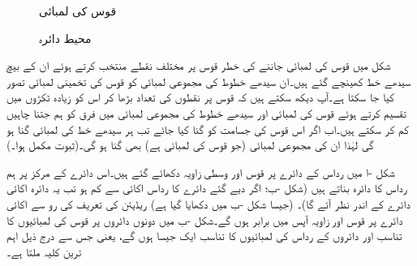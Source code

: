 \begin{figure}
\centering
\begin{minipage}{0.45\textwidth}
\centering
{}
\caption{قوس کی لمبائی}
\label{شکل_ابتدا_قوس_لمبائی}
\end{minipage}\hfill
\begin{minipage}{0.45\textwidth}
\centering
\centering
{}
\caption{محیط دائرہ}
\label{شکل_ابتدا_دائرہ_اور_ریڈیئن}
\end{minipage}%
\end{figure}

شکل  میں قوس کی لمبائی جاننے کی خطر قوس پر مختلف نقطے منتخب کرتے ہوئے ان کے بیچ سیدھے خط کھینچے گئے ہیں۔ان سیدھے خطوط کی مجموعی لمبائی کو قوس کی تخمینی لمبائی تصور کیا جا سکتا ہے۔آپ دیکھ سکتے ہیں کہ قوس پر نقطوں کی تعداد بڑھا کر اس کو زیادہ ٹکڑوں میں تقسیم کرتے ہوئے قوس کی لمبائی اور سیدھے خطوط کی مجموعی لمبائی میں فرق کو ہم جتنا چاہیں کم کر سکتے ہیں۔اب اگر اس قوس کی جسامت کو  گنا کیا جائے تب ہر سیدھے خط کی لمبائی  گنا ہو گی لہٰذا ان کی مجموعی لمبائی (جو قوس کی لمبائی ہے) بھی  گنا ہو گی۔(ثبوت مکمل ہوا۔)


شکل -ا میں رداس  کے دائرے پر قوس  اور وسطی زاویہ  دکھائے گئے ہیں۔اس دائرے کے مرکز پر ہم  رداس کا دائرہ بناتے ہیں (شکل -ب؛ اگر دیے گئے دائرے کا رداس اکائی سے کم ہو تب یہ دائرہ اکائی دائرے کے اندر نظر آئے گا)۔ (جیسا شکل -ب میں دکھایا گیا ہے) ریڈیئن کی تعریف کی رو سے اکائی دائرے پر قوس اور زاویہ آپس میں برابر ہوں گے۔شکل -ب میں دونوں دائروں پر  قوس کی لمبائیوں کا تناسب  اور دائروں کے رداس کی لمبائیوں کا تناسب  ایک جیسا ہوں گے، یعنی  جس سے درج ذیل اہم ترین کلیہ ملتا ہے۔

